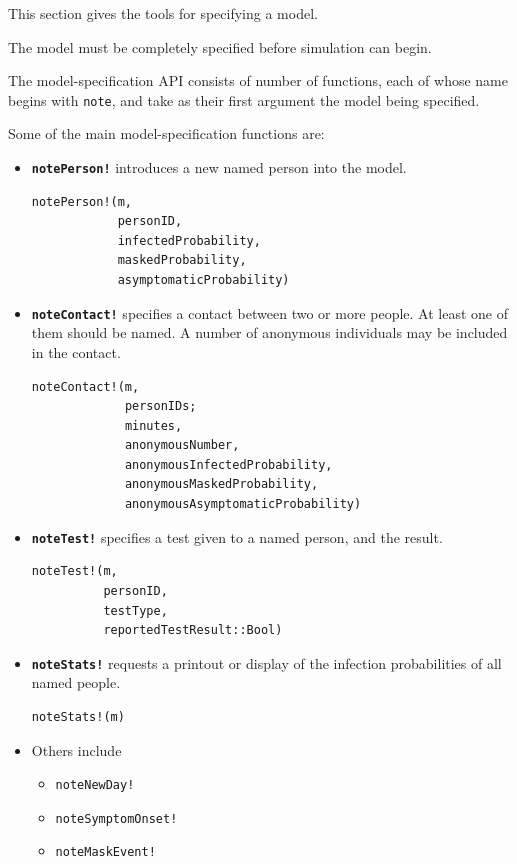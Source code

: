 \documentclass[11pt]{article}
\providecommand{\tightlist}{%
      \setlength{\itemsep}{0pt}\setlength{\parskip}{0pt}}
\begin{document}
This section gives the tools for specifying a model.

The model must be completely specified before simulation can begin.

The model-specification API consists of number of functions, each of
whose name begins with \texttt{note}, and take as their first argument
the model being specified.

Some of the main model-specification functions are:

\begin{itemize}
\item
  \textbf{\texttt{notePerson!}} introduces a new named person into the
  model.

\begin{verbatim}
notePerson!(m, 
            personID,
            infectedProbability,
            maskedProbability,
            asymptomaticProbability)
\end{verbatim}
\item
  \textbf{\texttt{noteContact!}} specifies a contact between two or more
  people. At least one of them should be named. A number of anonymous
  individuals may be included in the contact.

\begin{verbatim}
noteContact!(m,
             personIDs;
             minutes,
             anonymousNumber,
             anonymousInfectedProbability,
             anonymousMaskedProbability,
             anonymousAsymptomaticProbability)
\end{verbatim}
\item
  \textbf{\texttt{noteTest!}} specifies a test given to a named person,
  and the result.

\begin{verbatim}
noteTest!(m,
          personID,
          testType,
          reportedTestResult::Bool)
\end{verbatim}
\item
  \textbf{\texttt{noteStats!}} requests a printout or display of the
  infection probabilities of all named people.

\begin{verbatim}
noteStats!(m)
\end{verbatim}
\item
  Others include

  \begin{itemize}
  \tightlist
  \item
    \texttt{noteNewDay!}
  \item
    \texttt{noteSymptomOnset!}
  \item
    \texttt{noteMaskEvent!}
  \end{itemize}
\end{itemize}
\end{document}
